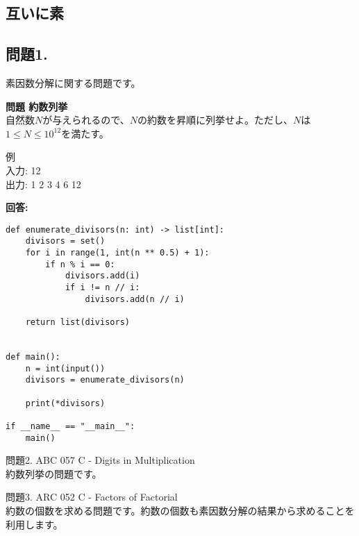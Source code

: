 \documentclass{jlreq}
\begin{document}
\subsection{互いに素}
\newpage
\subsection{問題1. }
素因数分解に関する問題です。

\begin{tcolorbox}[enhanced,
    colback=white!85!gray,
    drop fuzzy shadow,
    boxrule=0.3mm,
    arc=0mm,
    left=0pt,
    top=0pt,
    sharp corners,
    width=\textwidth,
    ]
    \textbf{問題 約数列挙} \\
    自然数$N$が与えられるので、$N$の約数を昇順に列挙せよ。ただし、$N$は$1 \leq N \leq 10^12$を満たす。

    例 \\
    入力: 12 \\
    出力: 1 2 3 4 6 12
  \tcblower
  
  \begin{tcolorbox}[
    coltext=white!10!blue,
    colback=white!90!purple!90!blue,
    drop fuzzy shadow,
    boxrule=0mm,
    arc=0mm,
    width=1.3cm,
    left=0pt,
    right=0pt,
    top=0pt,
    bottom=0pt,
    halign=flush left,
  ]
  \end{tcolorbox}
  \tcblower
  \textbf{回答:}
  \begin{lstlisting}
def enumerate_divisors(n: int) -> list[int]:
    divisors = set()
    for i in range(1, int(n ** 0.5) + 1):
        if n % i == 0:
            divisors.add(i)
            if i != n // i:
                divisors.add(n // i)
    
    return list(divisors)


def main():
    n = int(input())
    divisors = enumerate_divisors(n)
    
    print(*divisors)
    
if __name__ == "__main__":
    main()

  \end{lstlisting}
  \end{tcolorbox}%


問題2. ABC 057 C - Digits in Multiplication \\
約数列挙の問題です。

問題3. ARC 052 C - Factors of Factorial \\
約数の個数を求める問題です。約数の個数も素因数分解の結果から求めることを利用します。
\end{document}
